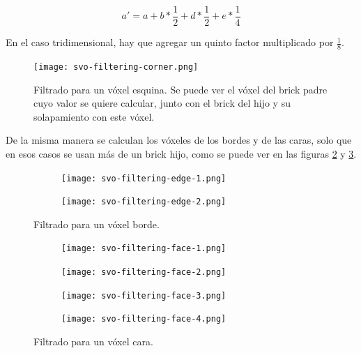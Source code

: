 $$
a' = a + b * \frac{1}{2} + d * \frac{1}{2} + e * \frac{1}{4}
$$

En el caso tridimensional, hay que agregar un quinto factor multiplicado por $\frac{1}{8}$.


\begin{figure}
    \centering
    \texttt{[image: svo-filtering-corner.png]}
    \caption{
        Filtrado para un vóxel esquina.
        Se puede ver el vóxel del brick padre cuyo valor se quiere calcular, junto con el brick del hijo y su solapamiento con este vóxel.
    }
    \label{fig:svo_filtering_corners}
\end{figure}

De la misma manera se calculan los vóxeles de los bordes y de las caras, solo que en esos casos se usan más de un brick hijo, como se puede ver en las figuras \ref{fig:svo_filtering_edges} y \ref{fig:svo_filtering_faces}.

\begin{figure}
    \begin{center}
        \begin{subfigure}{.24\textwidth}
            \texttt{[image: svo-filtering-edge-1.png]}
        \end{subfigure}
        \begin{subfigure}{.24\textwidth}
            \texttt{[image: svo-filtering-edge-2.png]}
        \end{subfigure}
    \end{center}
    \caption{Filtrado para un vóxel borde.}
    \label{fig:svo_filtering_edges}
\end{figure}

\begin{figure}
    \begin{center}
        \begin{subfigure}{.24\textwidth}
            \texttt{[image: svo-filtering-face-1.png]}
        \end{subfigure}
        \begin{subfigure}{.24\textwidth}
            \texttt{[image: svo-filtering-face-2.png]}
        \end{subfigure}
        \begin{subfigure}{.24\textwidth}
            \texttt{[image: svo-filtering-face-3.png]}
        \end{subfigure}
        \begin{subfigure}{.24\textwidth}
            \texttt{[image: svo-filtering-face-4.png]}
        \end{subfigure}
    \end{center}
    \caption{Filtrado para un vóxel cara.}
    \label{fig:svo_filtering_faces}
\end{figure}

